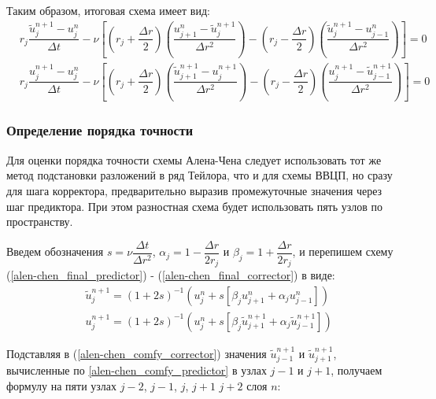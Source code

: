 Таким образом, итоговая схема имеет вид:
\begin{align} \label{alen-chen_final_predictor}
	&r_j \dfrac{\tilde{u}_j^{n+1} - u_j^n}{\Delta t}	-
	\nu \left[ \left(r_j + \dfrac{\Delta r}{2}\right) \left( \dfrac{u_{j+1}^{n} - \tilde{u}_j^{n+1}}{\Delta r^2} \right) -
	\left(r_j - \dfrac{\Delta r}{2}\right) \left( \dfrac{\tilde{u}_{j}^{n+1} - u_{j-1}^{n}}{\Delta r^2} \right) \right] = 0 \\
	\label{alen-chen_final_corrector}
	&r_j \dfrac{u_j^{n+1} - u_j^n}{\Delta t} -
	\nu \left[ \left(r_j + \dfrac{\Delta r}{2}\right) \left( \dfrac{\tilde{u}_{j+1}^{n+1} - u_j^{n+1}}{\Delta r^2} \right) -
	\left(r_j - \dfrac{\Delta r}{2}\right) \left( \dfrac{u_{j}^{n+1} - \tilde{u}_{j-1}^{n+1}}{\Delta r^2} \right) \right] = 0
\end{align}








\subsubsection{Определение порядка точности}

Для оценки порядка точности схемы Алена-Чена следует использовать тот же метод подстановки разложений в ряд Тейлора, что и для схемы ВВЦП, но сразу для шага корректора, предварительно выразив промежуточные значения через шаг предиктора. При этом разностная схема будет использовать пять узлов по пространству.

Введем обозначения $s=\nu \dfrac{\Delta t}{\Delta r^2}$, $\alpha_j=1-\dfrac{\Delta r}{2r_j}$ и $\beta_j=1+\dfrac{\Delta r}{2r_j}$, и перепишем схему (\ref{alen-chen_final_predictor}) - (\ref{alen-chen_final_corrector}) в виде:
\begin{align} \label{alen-chen_comfy_predictor}
	&\tilde{u}_j^{n+1} =
	\left( 1 + 2s \right)^{-1} \left( u_j^n + s \left[ \beta_j u_{j+1}^n + \alpha_j u_{j-1}^n \right] \right) \\
	\label{alen-chen_comfy_corrector}
	&u_j^{n+1} = \left( 1 + 2s \right)^{-1} \left( u_j^n + s \left[ \beta_j \tilde{u}_{j+1}^{n+1} + \alpha_j \tilde{u}_{j-1}^{n+1} \right] \right)
\end{align}

Подставляя в (\ref{alen-chen_comfy_corrector}) значения $\tilde u_{j-1}^{n+1}$ и $\tilde u_{j+1}^{n+1}$, вычисленные по \eqref{alen-chen_comfy_predictor}
в узлах $j-1$ и $j+1$, получаем формулу на пяти узлах $j-2$, $j-1$, $j$, $j+1$ $j+2$ слоя $n$:

